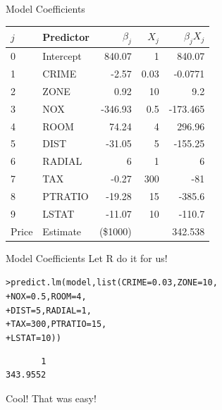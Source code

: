 \documentclass{beamer}\usepackage[]{graphicx}\usepackage[]{color}
\makeatletter
\newcommand{\hlnum}[1]{\textcolor[rgb]{0.824,0.412,0.118}{#1}}%
\newcommand{\hlstd}[1]{\textcolor[rgb]{1,0.894,0.769}{#1}}%
\newcommand{\hlkwc}[1]{\textcolor[rgb]{0.78,0.941,0.545}{#1}}%
\newcommand{\hlkwd}[1]{\textcolor[rgb]{1,0.78,0.769}{#1}}%
\newenvironment{kframe}{%
 \def\at@end@of@kframe{}%
 \ifinner\ifhmode%
  \def\at@end@of@kframe{\end{minipage}}%
  \begin{minipage}{\columnwidth}%
 \fi\fi%
 \def\FrameCommand##1{\hskip\@totalleftmargin \hskip-\fboxsep
 \colorbox{shadecolor}{##1}\hskip-\fboxsep
     \hskip-\linewidth \hskip-\@totalleftmargin \hskip\columnwidth}%
 \MakeFramed {\advance\hsize-\width
   \@totalleftmargin\z@ \linewidth\hsize
   \@setminipage}}%
 {\par\unskip\endMakeFramed%
 \at@end@of@kframe}
\newenvironment{knitrout}{}{} %
\makeatother
\begin{document}
\begin{darkframes}
\begin{frame}[fragile]{Model Coefficients}
\begin{table}[!b]
{\begin{tabularx}{\textwidth}{XXrrr}
           $j$ & Predictor  & $\beta_j$   &  $X_j$  & $\beta_j X_j$ \\ 
          \toprule
            0 & Intercept	&	840.07	&	1	&	840.07  \\
            1 & CRIME	&	-2.57	&	0.03	&	-0.0771  \\
            2 & ZONE	&	0.92	&	10	&	9.2  \\
            3 & NOX	&	-346.93	&	0.5	&	-173.465  \\
            4 & ROOM	&	74.24	&	4	&	296.96  \\
            5 & DIST	&	-31.05	&	5	&	-155.25  \\
            6 & RADIAL	&	6	&	1	&	6  \\
            7 & TAX	&	-0.27	&	300	&	-81  \\
            8 & PTRATIO	&	-19.28	&	15	&	-385.6  \\
            9 & LSTAT	&	-11.07	&	10	&	-110.7  \\
          \bottomrule
             Price &  Estimate 	& (\$1000)		&		&	342.538   \\
        
        
        \end{tabularx}}
        
      \end{table} 
      
    \end{frame}



    \begin{frame}[fragile]{Model Coefficients}
      Let R do it for us!
      
\begin{knitrout}
\begin{kframe}
\begin{alltt}
\hlstd{> }\hlkwd{predict.lm}\hlstd{(model,} \hlkwd{list}\hlstd{(}\hlkwc{CRIME}\hlstd{=}\hlnum{0.03}\hlstd{,} \hlkwc{ZONE}\hlstd{=}\hlnum{10}\hlstd{,}
\hlstd{+ }                       \hlkwc{NOX}\hlstd{=}\hlnum{0.5}\hlstd{,} \hlkwc{ROOM}\hlstd{=}\hlnum{4}\hlstd{,}
\hlstd{+ }                       \hlkwc{DIST}\hlstd{=}\hlnum{5}\hlstd{,}  \hlkwc{RADIAL}\hlstd{=}\hlnum{1}\hlstd{,}
\hlstd{+ }                       \hlkwc{TAX}\hlstd{=}\hlnum{300}\hlstd{,} \hlkwc{PTRATIO}\hlstd{=}\hlnum{15}\hlstd{,}
\hlstd{+ }                       \hlkwc{LSTAT}\hlstd{=}\hlnum{10}\hlstd{))}
\end{alltt}
\begin{verbatim}
       1 
343.9552 
\end{verbatim}
\end{kframe}
\end{knitrout}
      \pause
      Cool! That was easy!
      

\end{frame}
\end{darkframes}
\end{document}

